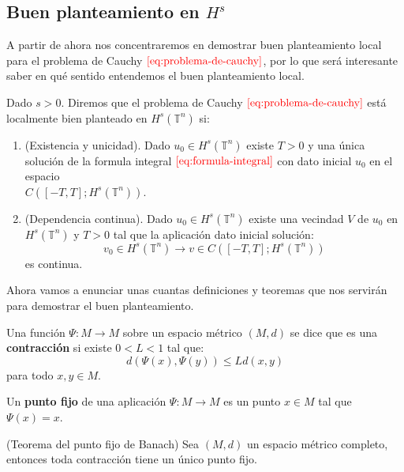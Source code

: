   \subsection{Buen planteamiento en $H^s$}
    A partir de ahora nos concentraremos en demostrar buen planteamiento local para el problema de Cauchy $\textcolor{red}{\ref{eq:problema-de-cauchy}}$, por lo que será interesante saber en qué sentido entendemos el buen planteamiento local.
    \begin{definition}
      Dado $s>0$. Diremos que el problema de Cauchy $\textcolor{red}{\ref{eq:problema-de-cauchy}}$ está localmente bien planteado en $H^s(\mathbb{T}^{n})$ si:
      \begin{enumerate}
        \item (Existencia y unicidad). Dado $u_0\in H^s(\mathbb{T}^{n})$ existe $T>0$ y una única solución de la formula integral $\textcolor{red}{\ref{eq:formula-integral}}$ con dato inicial $u_0$ en el espacio\\
        $C([-T,T];H^s(\mathbb{T}^{n}))$.
        \item (Dependencia continua). Dado $u_0\in H^s(\mathbb{T}^{n})$ existe una vecindad $V$ de $u_0$ en $H^s(\mathbb{T}^{n})$ y $T>0$ tal que la aplicación dato inicial solución:
        $$v_0\in H^s(\mathbb{T}^{n})\to v\in C([-T,T];H^s(\mathbb{T}^{n}))$$
        es continua. 
      \end{enumerate}
    \end{definition}
    Ahora vamos a enunciar unas cuantas definiciones y teoremas que nos servirán para demostrar el buen planteamiento.
    \begin{definition}\label{definition:contraccion}
      Una función $\Psi:M\to M$ sobre un espacio métrico $(M,d)$ se dice que es una \textbf{contracción} si existe $0<L<1$ tal que:
      \begin{equation}
        d(\Psi(x),\Psi(y))\leq Ld(x,y)\label{eq:contraccion}
      \end{equation}
      para todo $x,y\in M$.
    \end{definition}
    \begin{definition}\label{definition:punto-fijo}
      Un \textbf{punto fijo} de una aplicación $\Psi:M\to M$ es un punto $x\in M$ tal que $\Psi(x)=x$.
    \end{definition}
    \begin{theorem}(Teorema del punto fijo de Banach)\label{theorem:teorema-del-punto-fijo}
      Sea $(M,d)$ un espacio métrico completo, entonces toda contracción tiene un único punto fijo. 
    \end{theorem}
